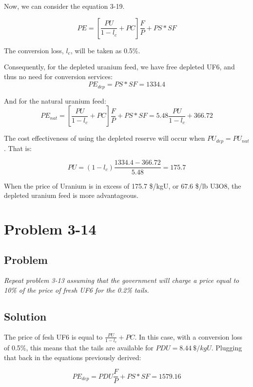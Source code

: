 Now, we can consider the equation 3-19.

\begin{equation}
PE = \left[\frac{PU}{1-l_c} + PC\right]\frac{F}{P} + PS*SF
\end{equation}

The conversion loss, $l_c$, will be taken as 0.5\%.

Consequently, for the depleted uranium feed, we have free depleted UF6, and thus no need for conversion services:
\begin{equation}
PE_{dep} = PS*SF = 1334.4
\end{equation}

And for the natural uranium feed:
\begin{equation}
PE_{nat} = \left[\frac{PU}{1-l_c} + PC\right]\frac{F}{P} + PS*SF = 5.48\frac{PU}{1-l_c} + 366.72
\end{equation}

The cost effectiveness of using the depleted reserve will occur when $PU_{dep} = PU_{nat}$. That is:

\begin{equation}
PU = (1-l_c)\frac{1334.4-366.72}{5.48} = 175.7
\end{equation}

When the price of Uranium is in excess of 175.7 \$/kgU, or 67.6 \$/lb U3O8, the depleted uranium feed is more advantageous.

\section{Problem 3-14}
\label{prob314}

\subsection{Problem}
\textit{Repeat problem 3-13 assuming that the government will charge a price equal to 10\% of the price of fresh UF6 for the 0.2\% tails.}

\subsection{Solution}

The price of fesh UF6 is equal to $\frac{PU}{1-l_c}+PC$. In this case, with a conversion loss of 0.5\%, this means that the tails are available for $PDU = 8.44\ \$/kgU$. Plugging that back in the equations previously derived:

\begin{equation}
PE_{dep} = PDU\frac{F}{P} + PS*SF = 1579.16
\end{equation}

